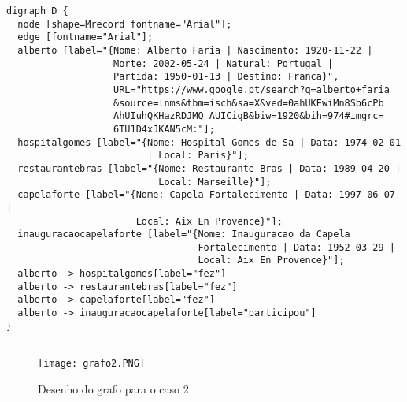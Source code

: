 \documentclass[a4paper]{article}
\begin{document}
\lstset{language=tex}
\begin{lstlisting}
digraph D {
  node [shape=Mrecord fontname="Arial"];
  edge [fontname="Arial"];
  alberto [label="{Nome: Alberto Faria | Nascimento: 1920-11-22 | 
                   Morte: 2002-05-24 | Natural: Portugal | 
                   Partida: 1950-01-13 | Destino: Franca}", 
                   URL="https://www.google.pt/search?q=alberto+faria
                   &source=lnms&tbm=isch&sa=X&ved=0ahUKEwiMn8Sb6cPb
                   AhUIuhQKHazRDJMQ_AUICigB&biw=1920&bih=974#imgrc=
                   6TU1D4xJKAN5cM:"];
  hospitalgomes [label="{Nome: Hospital Gomes de Sa | Data: 1974-02-01 
                         | Local: Paris}"];
  restaurantebras [label="{Nome: Restaurante Bras | Data: 1989-04-20 |
                           Local: Marseille}"];
  capelaforte [label="{Nome: Capela Fortalecimento | Data: 1997-06-07 |
                       Local: Aix En Provence}"];
  inauguracaocapelaforte [label="{Nome: Inauguracao da Capela 
                                  Fortalecimento | Data: 1952-03-29 |
                                  Local: Aix En Provence}"];
  alberto -> hospitalgomes[label="fez"]
  alberto -> restaurantebras[label="fez"]
  alberto -> capelaforte[label="fez"]
  alberto -> inauguracaocapelaforte[label="participou"]
}


\end{lstlisting}


\begin{sidewaysfigure}
\centering
\texttt{[image: grafo2.PNG]}
\caption{Desenho do grafo para o caso 2}
\end{sidewaysfigure}





\pagebreak
\end{document}
